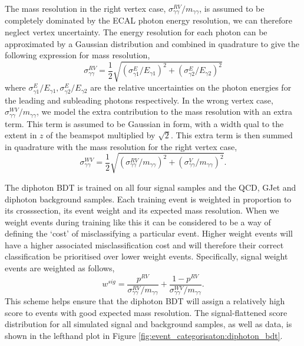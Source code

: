 The mass resolution in the right vertex case, $\sigma^{RV}_{\gamma\gamma}/m_{\gamma\gamma}$, is assumed to be completely dominated by the ECAL photon energy resolution, we can therefore neglect vertex uncertainty. The energy resolution for each photon can be approximated by a Gaussian distribution and combined in quadrature to give the following expression for mass resolution,
\begin{equation}
    \sigma^{RV}_{\gamma\gamma} = \frac{1}{2}\sqrt{(\sigma^{E}_{\gamma{1}}/E_{\gamma{1}})^2 + (\sigma^{E}_{\gamma{2}}/E_{\gamma{2}})^2}
\end{equation} 
where $\sigma^{E}_{\gamma{1}}/E_{\gamma{1}}, \sigma^{E}_{\gamma{2}}/E_{\gamma{2}}$ are the relative uncertainties on the photon energies for the leading and subleading photons respectively. 
In the wrong vertex case, $\sigma^{WV}_{\gamma\gamma}/m_{\gamma\gamma}$, we model the extra contribution to the mass resolution with an extra term. This term is assumed to be Gaussian in form, with a width qual to the extent in $z$ of the beamspot multiplied by $\sqrt{2}$. This extra term is then summed in quadrature with the mass resolution for the right vertex case,
\begin{equation}
    \sigma^{WV}_{\gamma\gamma} = \frac{1}{2}\sqrt{(\sigma^{RV}_{\gamma\gamma}/m_{\gamma\gamma})^2 + (\sigma^{V}_{\gamma\gamma}/m_{\gamma\gamma})^2}.
\end{equation} 


The diphoton BDT is trained on all four signal samples and the QCD, GJet and diphoton background samples. 
Each training event is weighted in proportion to its crosssection, its event weight and its expected mass resolution. 
When we weight events during training like this it can be considered to be a way of defining the `cost' of misclassifying a particular event. Higher weight events will have a higher associated misclassification cost and will therefore their correct classification be prioritised over lower weight events. 
Specifically, signal weight events are weighted as follows,
\begin{equation}
    w^{sig} = \frac{p^{RV}}{\sigma^{RV}_{\gamma\gamma}/m_{\gamma\gamma}} + \frac{1-p^{RV}}{\sigma^{WV}_{\gamma\gamma}/m_{\gamma\gamma}}.
\end{equation}
This scheme helps ensure that the diphoton BDT will assign a relatively high score to events with good expected mass resolution. 
The signal-flattened score distribution for all simulated signal and background samples, as well as data, is shown in the lefthand plot in Figure \ref{fig:event_categorisaton:diphoton_bdt}. 

